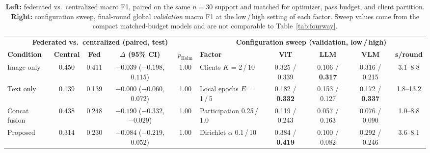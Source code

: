 \documentclass[conference]{IEEEtran}
\begin{document}
\begin{table}[!tb]
\caption{\textbf{Left:} federated vs.\ centralized macro F1, paired on the same $n{=}30$ support and matched for optimizer, pass budget, and client partition. \textbf{Right:} configuration sweep, final-round global \emph{validation} macro F1 at the low\,/\,high setting of each factor. Sweep values come from the compact matched-budget models and are not comparable to Table~\ref{tab:fourway}.}
\label{tab:fed}
\centering\footnotesize
\setlength\tabcolsep{5pt}
\begin{tabular}{lcccc@{\hskip 20pt}lcccc}
\toprule
\multicolumn{5}{c}{\textbf{Federated vs.\ centralized (paired, test)}} & \multicolumn{5}{c}{\textbf{Configuration sweep (validation, low\,/\,high)}}\\
\cmidrule(lr){1-5}\cmidrule(lr){6-10}
\textbf{Condition} & \textbf{Central} & \textbf{Fed} & \textbf{$\Delta$ (95\% CI)} & \textbf{$p_{\text{Holm}}$} &
\textbf{Factor} & \textbf{ViT} & \textbf{LLM} & \textbf{VLM} & \textbf{s/round}\\
\midrule
Image only    & 0.450 & 0.411 & $-0.039$ ($-0.198$, $0.115$)  & 1.00 & Clients $K$ = 2\,/\,10        & 0.325 / 0.339 & 0.106 / \textbf{0.317} & 0.316 / 0.215 & 3.1--8.8\\
Text only     & 0.139 & 0.139 & $-0.000$ ($-0.060$, $0.072$)  & 1.00 & Local epochs $E$ = 1\,/\,5    & 0.182 / \textbf{0.332} & 0.153 / 0.127 & 0.172 / \textbf{0.337} & 1.8--13.2\\
Concat fusion & 0.438 & 0.248 & $-0.190$ ($-0.332$, $-0.029$) & 1.00 & Participation 0.25\,/\,1.0    & 0.119 / 0.243 & 0.057 / 0.163 & 0.076 / 0.090 & 1.0--8.8\\
Proposed      & 0.314 & 0.230 & $-0.084$ ($-0.219$, $0.052$)  & 1.00 & Dirichlet $\alpha$ 0.1\,/\,10 & 0.384 / \textbf{0.419} & 0.100 / 0.082 & 0.292 / 0.246 & 3.6--8.1\\
\bottomrule
\end{tabular}
\end{table}
\end{document}
